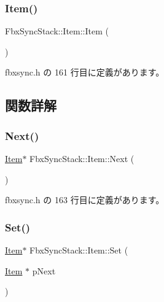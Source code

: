 \subsubsection{\texorpdfstring{Item()}{Item()}}
{\footnotesize\ttfamily Fbx\+Sync\+Stack\+::\+Item\+::\+Item (\begin{DoxyParamCaption}{ }\end{DoxyParamCaption})\hspace{0.3cm}{\ttfamily [inline]}}



 fbxsync.\+h の 161 行目に定義があります。



\subsection{関数詳解}
\mbox{\label{struct_fbx_sync_stack_1_1_item_ac9530826bd267a41c9159e229c535140}} 
\subsubsection{\texorpdfstring{Next()}{Next()}}
{\footnotesize\ttfamily \hyperlink{struct_fbx_sync_stack_1_1_item}{Item}$\ast$ Fbx\+Sync\+Stack\+::\+Item\+::\+Next (\begin{DoxyParamCaption}{ }\end{DoxyParamCaption})\hspace{0.3cm}{\ttfamily [inline]}}



 fbxsync.\+h の 163 行目に定義があります。

\mbox{\label{struct_fbx_sync_stack_1_1_item_a0f671eabe5aa22be73b340d313450423}} 
\subsubsection{\texorpdfstring{Set()}{Set()}}
{\footnotesize\ttfamily \hyperlink{struct_fbx_sync_stack_1_1_item}{Item}$\ast$ Fbx\+Sync\+Stack\+::\+Item\+::\+Set (\begin{DoxyParamCaption}\item[{\hyperlink{struct_fbx_sync_stack_1_1_item}{Item} $\ast$}]{p\+Next }\end{DoxyParamCaption})\hspace{0.3cm}{\ttfamily [inline]}}



